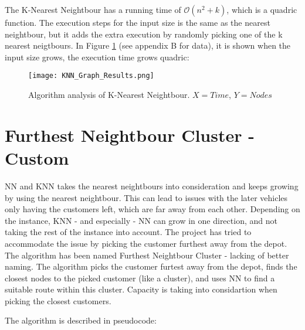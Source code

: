 \documentclass[12pt]{article}
\begin{document}
The K-Nearest Neightbour has a running time of $\mathcal{O}(n^2 + k)$, which is a quadric function. The execution steps for the input size is the same as the nearest neightbour, but it adds the extra execution by randomly picking one of the k nearest neigtbours.
In Figure \ref{fig:knnanalysis} (see appendix B for data), it is shown when the input size grows, the execution time grows quadric:

\begin{figure}[H]
	\caption{Algorithm analysis of K-Nearest Neightbour. $X = Time$, $Y = Nodes$}
	\centering
	\texttt{[image: KNN\_Graph\_Results.png]}
	\label{fig:knnanalysis}

\end{figure}

\newpage

\section{Furthest Neightbour Cluster - Custom} 

NN and KNN takes the nearest neightbours into consideration and keeps growing by using the nearest neightbour. This can lead to issues with the later vehicles only having the customers left, which are far away from each other. Depending on the instance, KNN - and especially - NN can grow in one direction, and not taking the rest of the instance into account.  
The project has tried to accommodate the issue by picking the customer furthest away from the depot. The algorithm has been named Furthest Neightbour Cluster - lacking of better naming. The algorithm picks the customer furtest away from the depot, finds the closest nodes to the picked customer (like a cluster), and uses NN to find a suitable route within this cluster. Capacity is taking into considartion when picking the closest customers.

The algorithm is described in pseudocode:
\end{document}
